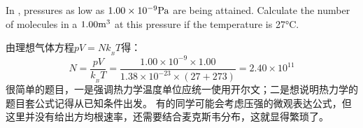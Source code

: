 \chapter[热力学]{}
\begin{solution}[ Pressure]
    In  , pressures as low as $1.00\times10^{-9}\rm{Pa}$ are being attained.
    Calculate the number of molecules in a $1.00\rm{m^{3}}$  at this pressure if the temperature is 27°C.

    \tcbrule

    由理想气体方程$pV=Nk_{_B}T$得：
    \begin{equation*}
        N = \frac{pV}{k_{_B}T} = \frac{1.00\times10^{-9}\times 1.00}{1.38\times 10^{-23}\times (27+273)} = 2.40 \times 10^{11}
    \end{equation*}
    很简单的题目，一是强调热力学温度单位应统一使用开尔文；二是想说明热力学的题目套公式记得从已知条件出发。
    有的同学可能会考虑压强的微观表达公式，但这里并没有给出方均根速率，还需要结合麦克斯韦分布，这就显得繁琐了。
\end{solution}
